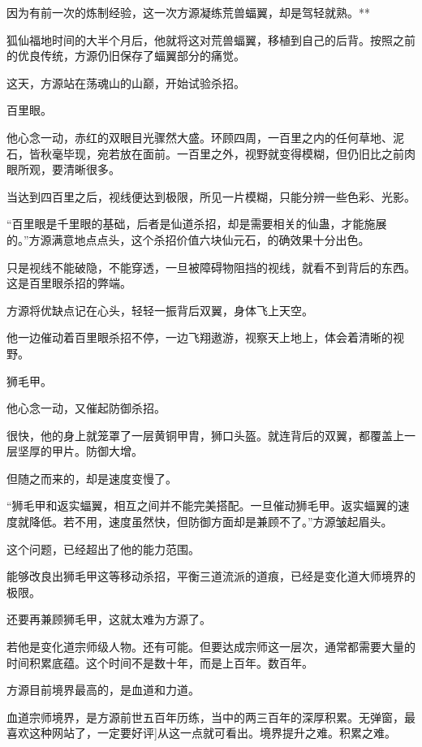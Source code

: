 
\begin{this_body}

因为有前一次的炼制经验，这一次方源凝练荒兽蝠翼，却是驾轻就熟。**

狐仙福地时间的大半个月后，他就将这对荒兽蝠翼，移植到自己的后背。按照之前的优良传统，方源仍旧保存了蝠翼部分的痛觉。

这天，方源站在荡魂山的山巅，开始试验杀招。

百里眼。

他心念一动，赤红的双眼目光骤然大盛。环顾四周，一百里之内的任何草地、泥石，皆秋毫毕现，宛若放在面前。一百里之外，视野就变得模糊，但仍旧比之前肉眼所观，要清晰很多。

当达到四百里之后，视线便达到极限，所见一片模糊，只能分辨一些色彩、光影。

“百里眼是千里眼的基础，后者是仙道杀招，却是需要相关的仙蛊，才能施展的。”方源满意地点点头，这个杀招价值六块仙元石，的确效果十分出色。

只是视线不能破隐，不能穿透，一旦被障碍物阻挡的视线，就看不到背后的东西。这是百里眼杀招的弊端。

方源将优缺点记在心头，轻轻一振背后双翼，身体飞上天空。

他一边催动着百里眼杀招不停，一边飞翔遨游，视察天上地上，体会着清晰的视野。

狮毛甲。

他心念一动，又催起防御杀招。

很快，他的身上就笼罩了一层黄铜甲胄，狮口头盔。就连背后的双翼，都覆盖上一层坚厚的甲片。防御大增。

但随之而来的，却是速度变慢了。

“狮毛甲和返实蝠翼，相互之间并不能完美搭配。一旦催动狮毛甲。返实蝠翼的速度就降低。若不用，速度虽然快，但防御方面却是兼顾不了。”方源皱起眉头。

这个问题，已经超出了他的能力范围。

能够改良出狮毛甲这等移动杀招，平衡三道流派的道痕，已经是变化道大师境界的极限。

还要再兼顾狮毛甲，这就太难为方源了。

若他是变化道宗师级人物。还有可能。但要达成宗师这一层次，通常都需要大量的时间积累底蕴。这个时间不是数十年，而是上百年。数百年。

方源目前境界最高的，是血道和力道。

血道宗师境界，是方源前世五百年历练，当中的两三百年的深厚积累。无弹窗，最喜欢这种网站了，一定要好评]从这一点就可看出。境界提升之难。积累之难。


\end{this_body}
